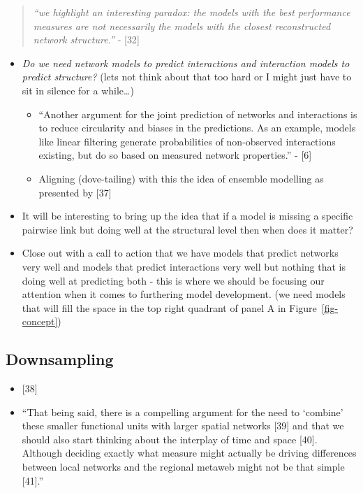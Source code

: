 \documentclass[
]{article}
\begin{document}
\begin{quote}
\emph{``we highlight an interesting paradox: the models with the best
performance measures are not necessarily the models with the closest
reconstructed network structure.''} - {[}32{]}
\end{quote}

\begin{itemize}
\item
  \emph{Do we need network models to predict interactions and
  interaction models to predict structure?} (lets not think about that
  too hard or I might just have to sit in silence for a while\ldots)

  \begin{itemize}
  \item
    ``Another argument for the joint prediction of networks and
    interactions is to reduce circularity and biases in the predictions.
    As an example, models like linear filtering generate probabilities
    of non-observed interactions existing, but do so based on measured
    network properties.'' - {[}6{]}
  \item
    Aligning (dove-tailing) with this the idea of ensemble modelling as
    presented by {[}37{]}
  \end{itemize}
\item
  It will be interesting to bring up the idea that if a model is missing
  a specific pairwise link but doing well at the structural level then
  when does it matter?
\item
  Close out with a call to action that we have models that predict
  networks very well and models that predict interactions very well but
  nothing that is doing well at predicting both - this is where we
  should be focusing our attention when it comes to furthering model
  development. (we need models that will fill the space in the top right
  quadrant of panel A in Figure~\ref{fig-concept})
\end{itemize}

\subsection{Downsampling}\label{downsampling}

\begin{itemize}
\item
  {[}38{]}
\item
  ``That being said, there is a compelling argument for the need to
  `combine' these smaller functional units with larger spatial networks
  {[}39{]} and that we should also start thinking about the interplay of
  time and space {[}40{]}. Although deciding exactly what measure might
  actually be driving differences between local networks and the
  regional metaweb might not be that simple {[}41{]}.''
\end{itemize}
\end{document}
